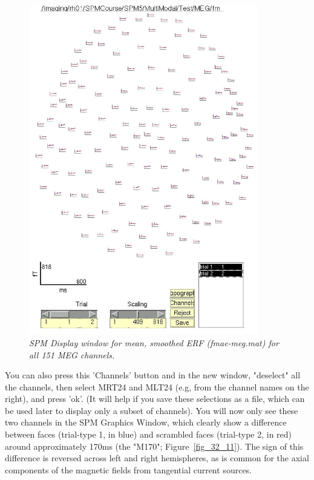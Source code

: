 \begin{figure}
\begin{center}
\includegraphics[width=100mm]{multimodal/figures/figure_32_10}
\caption{\em SPM Display window for mean, smoothed ERF (fmae-meg.mat) for all 151 MEG channels. \label{fig_32_10}}
\end{center}
\end{figure}

You can also press this 'Channels' button and in the new window, "deselect" all the channels, then select MRT24 and MLT24 (e.g, from the channel names on the right), and press 'ok'. (It will help if you save these selections as a file, which can be used later to display only a subset of channels). You will now only see these two channels in the SPM Graphics Window, which clearly show a difference between faces (trial-type 1, in blue) and scrambled faces (trial-type 2, in red) around approximately 170ms (the "M170"; Figure~\ref{fig_32_11}). The sign of this difference is reversed across left and right hemispheres, as is common for the axial components of the magnetic fields from tangential current sources.


